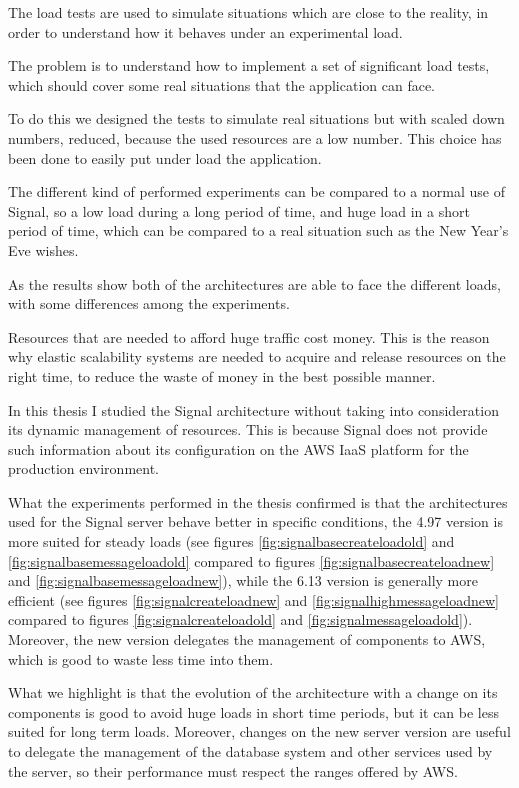 The load tests are used to simulate situations which are close to the reality, in order to understand how it behaves under an experimental load.

The problem is to understand how to implement a set of significant load tests, which should cover some real situations that the application can face.

To do this we designed the tests to simulate real situations but with scaled down numbers, reduced, because the used resources are a low number. This choice has been done to easily put under load the application.

The different kind of performed experiments can be compared to a normal use of Signal, so a low load during a long period of time, and huge load in a short period of time, which can be compared to a real situation such as the New Year's Eve wishes.

As the results show both of the architectures are able to face the different loads, with some differences among the experiments.

Resources that are needed to afford huge traffic cost money. This is the reason why elastic scalability systems are needed to acquire and release resources on the right time, to reduce the waste of money in the best possible manner.

In this thesis I studied the Signal architecture without taking into consideration its dynamic management of resources.
This is because Signal does not provide such information about its configuration on the AWS IaaS platform for the production environment.

What the experiments performed in the thesis confirmed is that the architectures used for the Signal server behave better in specific conditions, the 4.97 version is more suited for steady loads (see figures \vref{fig:signalbasecreateloadold} and \vref{fig:signalbasemessageloadold} compared to figures \vref{fig:signalbasecreateloadnew} and \vref{fig:signalbasemessageloadnew}), while the 6.13 version is generally more efficient (see figures \vref{fig:signalcreateloadnew} and \vref{fig:signalhighmessageloadnew} compared to figures \vref{fig:signalcreateloadold} and \vref{fig:signalmessageloadold}).
Moreover, the new version delegates the management of components to AWS, which is good to waste less time into them.

What we highlight is that the evolution of the architecture with a change on its components is good to avoid huge loads in short time periods, but it can be less suited for long term loads.
Moreover, changes on the new server version are useful to delegate the management of the database system and other services used by the server, so their performance must respect the ranges offered by AWS.

